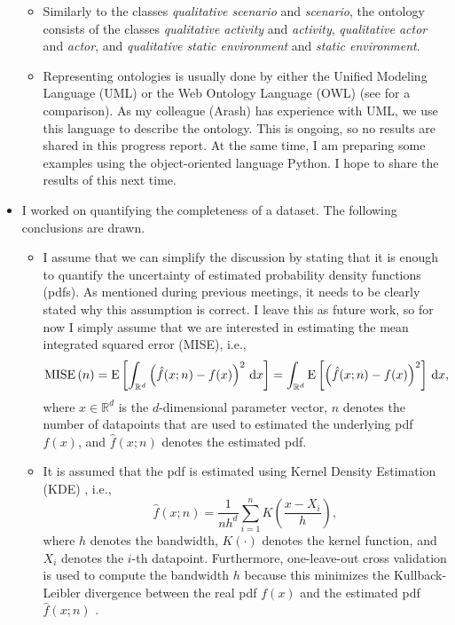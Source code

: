 \documentclass[10pt,final,a4paper,oneside,onecolumn]{article}
\newcommand{\expectation}[1]{\textup{E} \left[ #1 \right]}
\newcommand{\mise}[1]{\textup{MISE} \left( #1 \right)}
\begin{document}
\begin{itemize}
\begin{itemize}
		\item Similarly to the classes \emph{qualitative scenario} and \emph{scenario}, the ontology consists of the classes \emph{qualitative activity} and \emph{activity}, \emph{qualitative actor} and \emph{actor}, and \emph{qualitative static environment} and \emph{static environment}. 
		
		\item Representing ontologies is usually done by either the Unified Modeling Language (UML) or the Web Ontology Language (OWL) (see \cite{atkinson2005detailed} for a comparison). As my colleague (Arash) has experience with UML, we use this language to describe the ontology. This is ongoing, so no results are shared in this progress report. At the same time, I am preparing some examples using the object-oriented language Python. I hope to share the results of this next time.
	\end{itemize}

	\item I worked on quantifying the completeness of a dataset. The following conclusions are drawn.
	\begin{itemize}
		\item I assume that we can simplify the discussion by stating that it is enough to quantify the uncertainty of estimated probability density functions (pdfs). As mentioned during previous meetings, it needs to be clearly stated why this assumption is correct. I leave this as future work, so for now I simply assume that we are interested in estimating the mean integrated squared error (MISE), i.e., 
		\begin{equation} \label{eq:mise}
			\mise{n} = \expectation{ \int_{\mathbb{R}^d} \left(\hat{f}(x;n) - f(x)\right)^2 \, \textup{d}x} = \int_{\mathbb{R}^d} \expectation{\left(\hat{f}(x;n) - f(x)\right)^2} \, \textup{d}x,
		\end{equation}
		where $x \in \mathbb{R}^d$ is the $d$-dimensional parameter vector, $n$ denotes the number of datapoints that are used to estimated the underlying pdf $f(x)$, and $\hat{f}(x;n)$ denotes the estimated pdf.
		
		\item It is assumed that the pdf is estimated using Kernel Density Estimation (KDE) \cite{rosenblatt1956remarks, parzen1962estimation}, i.e.,
		\begin{equation}
			\hat{f}(x;n) = \frac{1}{nh^d} \sum_{i=1}^n K \left( \frac{x - X_i}{h} \right),
		\end{equation}
		where $h$ denotes the bandwidth, $K(\cdot)$ denotes the kernel function, and $X_i$ denotes the $i$-th datapoint. Furthermore, one-leave-out cross validation is used to compute the bandwidth $h$ because this minimizes the Kullback-Leibler divergence between the real pdf $f(x)$ and the estimated pdf $\hat{f}(x;n)$ \cite{turlach1993bandwidthselection}.
		

\end{itemize}
\end{itemize}
\end{document}
